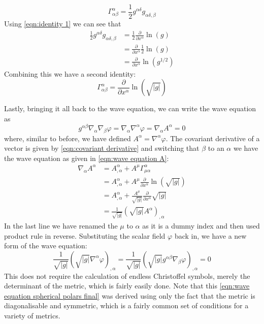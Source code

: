 \documentclass[11pt]{article}
\numberwithin{equation}{section}
\numberwithin{figure}{section}
\numberwithin{table}{section}
\begin{document}
\begin{equation*}
    \Gamma^\alpha_{\alpha\beta}=\frac{1}{2}g^{\alpha\delta}g_{\alpha\delta,\beta}
\end{equation*}
Using \cref{eqn:identity 1} we can see that 
\begin{align*}
    \frac{1}{2}g^{\alpha\delta}g_{\alpha\delta,\beta}&=\frac{1}{2}\frac{\partial}{\partial x^\alpha}\ln(g)\\
    &=\frac{\partial}{\partial x^\alpha}\frac{1}{2}\ln(g)\\
    &=\frac{\partial}{\partial x^\alpha}\ln(g^{1/2})
\end{align*}
Combining this we have a second identity:
\begin{equation}
    \Gamma^\alpha_{\alpha\beta}=\frac{\partial}{\partial x^\alpha}\ln(\sqrt{|g|})
    \label{eqn:identity 2}
\end{equation}
\par Lastly, bringing it all back to the wave equation, we can write the wave equation as 
\begin{equation}
    g^{\alpha\beta}\nabla_\alpha\nabla_\beta \varphi=\nabla_\alpha\nabla^\alpha \varphi=\nabla_\alpha A^\alpha=0
    \label{eqn:wave equation A}
\end{equation}
where, similar to before, we have defined $A^\alpha = \nabla^\alpha \varphi$. The covariant derivative of a vector is given by \cref{eqn:covariant derivative} and switching that $\beta$ to an $\alpha$ we have the wave equation as given in \cref{eqn:wave equation A}:
\begin{align*}
    \nabla_\alpha A^\alpha&=A^\alpha_{,\alpha}+A^\mu\Gamma^{\alpha}_{\mu\alpha}\\
    &=A^\alpha_{,\alpha}+A^\mu\frac{\partial}{\partial x^\alpha}\ln(\sqrt{|g|})\\
    &=A^\alpha_{,\alpha}+\frac{A^\mu}{\sqrt{|g|}}\frac{\partial}{\partial x^\alpha}\sqrt{|g|}\\
    &=\frac{1}{\sqrt{|g|}}(\sqrt{|g|}A^\alpha)_{,\alpha}
\end{align*}
In the last line we have renamed the $\mu$ to $\alpha$ as it is a dummy index and then used product rule in reverse. Substituting the scalar field $\varphi$ back in, we have a new form of the wave equation:
\begin{equation}
    \frac{1}{\sqrt{|g|}}(\sqrt{|g|}\nabla^\alpha\varphi)_{,\alpha}=\frac{1}{\sqrt{|g|}}(\sqrt{|g|}g^{\alpha\beta}\nabla_\beta\varphi)_{,\alpha}=0
    \label{eqn:wave equation spherical polars final}
\end{equation}
This does not require the calculation of endless Christoffel symbols, merely the determinant of the metric, which is fairly easily done. Note that this \cref{eqn:wave equation spherical polars final} was derived using only the fact that the metric is diagonalisable and symmetric, which is a fairly common set of conditions for a variety of metrics.
\end{document}
